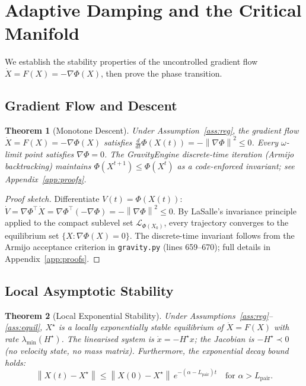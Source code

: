 \documentclass[11pt]{article}
\newtheorem{theorem}{Theorem}[section]
\theoremstyle{definition}
\newcommand{\Xst}{X^{\star}}
\newcommand{\grad}{\nabla}
\newcommand{\Lpair}{L_{\mathrm{pair}}}
\newcommand{\lmin}{\lambda_{\min}}
\newcommand{\norm}[1]{\left\|#1\right\|}
\newcommand{\ddt}{\tfrac{d}{dt}}
\begin{document}
\section{Adaptive Damping and the Critical Manifold}
\label{sec:damping}

We establish the stability properties of the uncontrolled gradient flow
$\dot X = F(X) = -\grad\Phi(X)$, then prove the phase transition.

\subsection{Gradient Flow and Descent}

\begin{theorem}[Monotone Descent]
\label{thm:descent}
Under Assumption~\ref{ass:reg}, the gradient flow $\dot{X} = F(X) = -\grad\Phi(X)$
satisfies $\ddt\Phi(X(t)) = -\norm{\grad\Phi}^2 \le 0$.  Every $\omega$-limit
point satisfies $\grad\Phi = 0$.  The GravityEngine discrete-time iteration
(Armijo backtracking) maintains $\Phi(X^{t+1})\le\Phi(X^t)$ as a code-enforced
invariant; see Appendix~\ref{app:proofs}.
\end{theorem}

\begin{proof}[Proof sketch]
Differentiate $V(t) = \Phi(X(t))$:
$\dot V = \grad\Phi^\top \dot X = \grad\Phi^\top(-\grad\Phi) = -\norm{\grad\Phi}^2 \le 0$.
By LaSalle's invariance principle~\citep{lasalle1960} applied to the compact
sublevel set $\mathcal{L}_{\Phi(X_0)}$, every trajectory converges to the equilibrium
set $\{X : \grad\Phi(X)=0\}$.  The discrete-time invariant follows from the
Armijo acceptance criterion in \texttt{gravity.py} (lines 659--670); full
details in Appendix~\ref{app:proofs}.
\end{proof}

\subsection{Local Asymptotic Stability}

\begin{theorem}[Local Exponential Stability]
\label{thm:las}
Under Assumptions~\ref{ass:reg}--\ref{ass:equil}, $\Xst$ is a locally exponentially
stable equilibrium of $\dot{X} = F(X)$ with rate $\lmin(H^\star)$.
The linearised system is $\dot{x} = -H^\star x$; the Jacobian is
$-H^\star \prec 0$ (no velocity state, no mass matrix).  Furthermore, the
exponential decay bound holds:
\[
  \norm{X(t) - \Xst} \le \norm{X(0)-\Xst}\,e^{-(\alpha - \Lpair)t}
  \quad \text{for } \alpha > \Lpair.
\]
\end{theorem}
\end{document}
